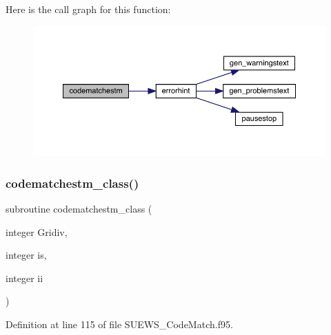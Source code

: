 Here is the call graph for this function\+:\nopagebreak
\begin{figure}[H]
\begin{center}
\leavevmode
\includegraphics[width=350pt]{_s_u_e_w_s___code_match_8f95_a690f98a34f5c8427a5f02571b24de6fe_cgraph}
\end{center}
\end{figure}
\mbox{\label{_s_u_e_w_s___code_match_8f95_a63ba5e040a6e29f1f36d27ca207f02ae}} 
\subsubsection{\texorpdfstring{codematchestm\+\_\+class()}{codematchestm\_class()}}
{\footnotesize\ttfamily subroutine codematchestm\+\_\+class (\begin{DoxyParamCaption}\item[{integer}]{Gridiv,  }\item[{integer}]{is,  }\item[{integer}]{ii }\end{DoxyParamCaption})}



Definition at line 115 of file S\+U\+E\+W\+S\+\_\+\+Code\+Match.\+f95.

